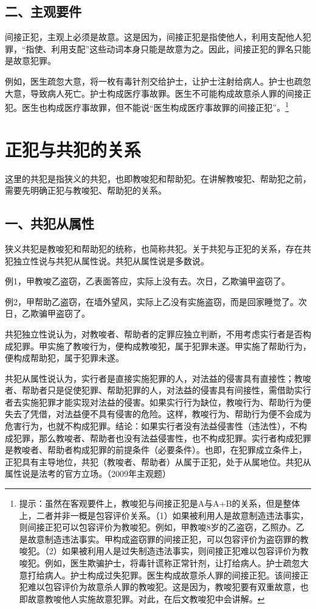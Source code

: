 \subsection*{二、主观要件}

间接正犯，主观上必须是故意。这是因为，间接正犯是指使他人，利用支配他人犯罪，“指使、利用支配”这些动词本身只能是故意为之。因此，间接正犯的罪名只能是故意犯罪。

例如，医生疏忽大意，将一枚有毒针剂交给护士，让护士注射给病人。护士也疏忽大意，导致病人死亡。护士构成医疗事故罪。医生不可能构成故意杀人罪的间接正犯。医生也构成医疗事故罪，但不能说“医生构成医疗事故罪的间接正犯”。\footnote{提示：虽然在客观要件上，教唆犯与间接正犯是A与A+B的关系，但是整体上，二者并非一概是包容评价关系。（1）如果被利用人是故意制造违法事实，则间接正犯可以包容评价为教唆犯。例如，甲教唆8岁的乙盗窃，乙照办。乙是故意制造违法事实。甲构成盗窃罪的间接正犯，可以包容评价为盗窃罪的教唆犯。（2）如果被利用人是过失制造违法事实，则间接正犯难以包容评价为教唆犯。例如，医生欺骗护士，将毒针谎称正常针剂，让打给病人。护士疏忽大意打给病人。护士构成过失犯罪。医生构成故意杀人罪的间接正犯。该间接正犯难以包容评价为故意杀人罪的教唆犯。这是因为，教唆犯要有双重故意，也即故意教唆他人实施故意犯罪。对此，在后文教唆犯中会讲解。}

\section{正犯与共犯的关系}

这里的共犯是指狭义的共犯，也即教唆犯和帮助犯。在讲解教唆犯、帮助犯之前，需要先明确正犯与教唆犯、帮助犯的关系。

\subsection*{一、共犯从属性}

狭义共犯是教唆犯和帮助犯的统称，也简称共犯。关于共犯与正犯的关系，存在共犯独立性说与共犯从属性说。共犯从属性说是多数说。

例1，甲教唆乙盗窃，乙表面答应，实际上没有去。次日，乙欺骗甲盗窃了。

例2，甲帮助乙盗窃，在墙外望风，实际上乙没有实施盗窃，而是回家睡觉了。次日，乙欺骗甲盗窃了。

共犯独立性说认为，对教唆者、帮助者的定罪应独立判断，不用考虑实行者是否构成犯罪。甲实施了教唆行为，便构成教唆犯，属于犯罪未遂。甲实施了帮助行为，便构成帮助犯，属于犯罪未遂。

共犯从属性说认为，实行者是直接实施犯罪的人，对法益的侵害具有直接性；教唆者、帮助者只是促使犯罪、帮助犯罪的人，对法益的侵害具有间接性，需借助实行者去实施犯罪才能实现对法益的侵害。如果实行行为缺位，教唆行为、帮助行为便失去了凭借，对法益便不具有侵害的危险。这样，教唆行为、帮助行为便不会成为危害行为，也就不构成犯罪。结论：如果实行者没有法益侵害性（违法性），不构成犯罪，那么教唆者、帮助者也没有法益侵害性，也不构成犯罪。实行者构成犯罪是教唆者、帮助者构成犯罪的前提条件（必要条件）。也即，在犯罪成立条件上，正犯具有主导地位，共犯（教唆者、帮助者）从属于正犯，处于从属地位。共犯从属性说是法考的官方立场。（2009年主观题）

